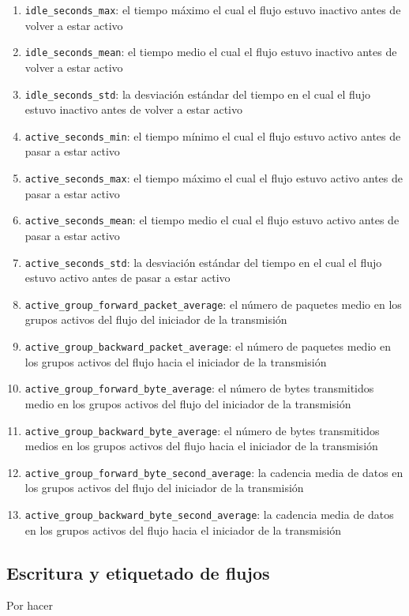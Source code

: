 \begin{enumerate}
  \item \texttt{idle\_seconds\_max}: el tiempo máximo el cual el flujo estuvo inactivo antes de volver a estar activo
  \item \texttt{idle\_seconds\_mean}: el tiempo medio el cual el flujo estuvo inactivo antes de volver a estar activo
  \item \texttt{idle\_seconds\_std}: la desviación estándar del tiempo en el cual el flujo estuvo inactivo antes de volver a estar activo
  \item \texttt{active\_seconds\_min}: el tiempo mínimo el cual el flujo estuvo activo antes de pasar a estar activo
  \item \texttt{active\_seconds\_max}: el tiempo máximo el cual el flujo estuvo activo antes de pasar a estar activo
  \item \texttt{active\_seconds\_mean}: el tiempo medio el cual el flujo estuvo activo antes de pasar a estar activo 
  \item \texttt{active\_seconds\_std}: la desviación estándar del tiempo en el cual el flujo estuvo activo antes de pasar a estar activo
  \item \texttt{active\_group\_forward\_packet\_average}: el número de paquetes medio en los grupos activos del flujo del iniciador de la transmisión
  \item \texttt{active\_group\_backward\_packet\_average}: el número de paquetes medio en los grupos activos del flujo hacia el iniciador de la transmisión
  \item \texttt{active\_group\_forward\_byte\_average}: el número de bytes transmitidos medio en los grupos activos del flujo del iniciador de la transmisión
  \item \texttt{active\_group\_backward\_byte\_average}: el número de bytes transmitidos medios en los grupos activos del flujo hacia el iniciador de la transmisión
  \item \texttt{active\_group\_forward\_byte\_second\_average}: la cadencia media de datos en los grupos activos del flujo del iniciador de la transmisión
  \item \texttt{active\_group\_backward\_byte\_second\_average}: la cadencia media de datos en los grupos activos del flujo hacia el iniciador de la transmisión
\end{enumerate}

\subsection{Escritura y etiquetado de flujos} \label{flowwrite}

Por hacer

